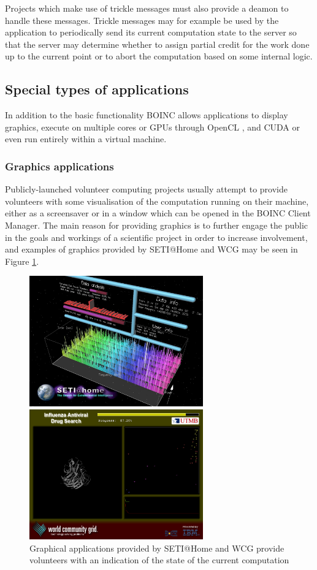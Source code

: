 Projects which make use of trickle messages must also provide a deamon to handle these messages. Trickle messages may for example be used by the application to periodically send its current computation state to the server  so that the server may   determine whether to assign partial credit for the work done up to the current point  or   to abort the computation based on some internal logic.

\subsection{Special types of applications}
In addition to the basic functionality BOINC allows applications to display graphics, execute on multiple cores or GPUs through OpenCL \cite{opencl}, and CUDA \cite{cuda} or even run entirely within a virtual machine. 
\subsubsection{Graphics applications}
Publicly-launched volunteer computing projects usually attempt to provide volunteers with some visualisation of the computation running on their machine, either as a screensaver or in a window which can be opened in the BOINC Client Manager. The main reason for providing graphics is to further engage the public in the goals and workings of a scientific project in order to increase involvement, and examples of graphics provided by SETI@Home and WCG may be seen in Figure \ref{fig:boincgraphics}.
\begin{figure}[htb]
\centering
\begin{minipage}{7.5cm}
\includegraphics[width=7.5cm]{images/graphics1}
 \end{minipage} \hspace{.1cm}
\begin{minipage}{7.5cm}
\includegraphics[width=7.5cm]{images/graphics2}
 \end{minipage}
\caption{Graphical applications provided by SETI@Home and WCG provide volunteers with an indication of the state of the current computation} \label{fig:boincgraphics}
\end{figure}
